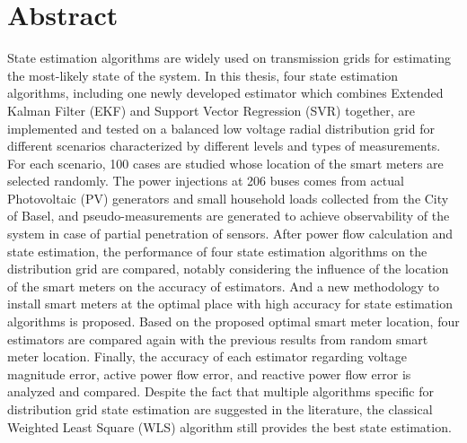 \chapter*{Abstract}
State estimation algorithms are widely used on transmission grids for estimating the most-likely state of the system. In this thesis, four state estimation algorithms, including one newly developed estimator which combines Extended Kalman Filter (EKF) and Support Vector Regression (SVR) together, are implemented and tested on a balanced low voltage radial distribution grid for different scenarios characterized by different levels and types of measurements. For each scenario, 100 cases are studied whose location of the smart meters are selected randomly. The power injections at 206 buses comes from actual Photovoltaic (PV) generators and small household loads collected from the City of Basel, and pseudo-measurements are generated to achieve observability of the system in case of partial penetration of sensors. After power flow calculation and state estimation, the performance of four state estimation algorithms on the distribution grid are compared, notably considering the influence of the location of the smart meters on the accuracy of estimators. And a new methodology to install smart meters at the optimal place with high accuracy for state estimation algorithms is proposed. Based on the proposed optimal smart meter location, four estimators are compared again with the previous results from random smart meter location. Finally, the accuracy of each estimator regarding voltage magnitude error, active power flow error, and reactive power flow error is analyzed and compared. Despite the fact that multiple algorithms specific for distribution grid state estimation are suggested in the literature, the classical Weighted Least Square (WLS) algorithm still provides the best state estimation.


\newpage